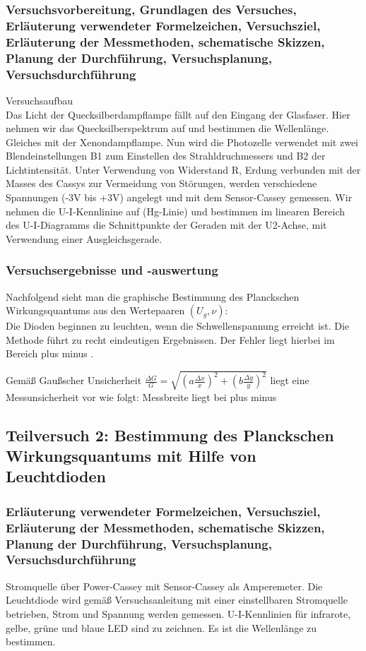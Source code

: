 \documentclass[12pt,oneside,oldfontcommands]{memoir}
\begin{document}
\subsubsection{Versuchsvorbereitung, Grundlagen des Versuches, Erläuterung verwendeter Formelzeichen, Versuchsziel, Erläuterung der Messmethoden, schematische Skizzen, Planung der Durchführung, Versuchsplanung, Versuchsdurchführung}
Versuchsaufbau\\
Das Licht der Quecksilberdampflampe fällt auf den Eingang der Glasfaser. Hier nehmen wir das Quecksilberspektrum auf und bestimmen die Wellenlänge. Gleiches mit der Xenondampflampe.
Nun wird die Photozelle verwendet mit zwei Blendeinstellungen B1 zum Einstellen des Strahldruchmessers und B2 der Lichtintensität. Unter Verwendung von Widerstand R, Erdung verbunden mit der Masses des Cassys zur Vermeidung von Störungen, werden verschiedene Spannungen (-3V bis +3V) angelegt und mit dem Sensor-Cassey gemessen.
Wir nehmen die U-I-Kennlinine auf (Hg-Linie) und bestimmen im linearen Bereich des U-I-Diagramms die Schnittpunkte der Geraden mit der U2-Achse, mit Verwendung einer Ausgleichsgerade.


\subsubsection{Versuchsergebnisse und -auswertung}
Nachfolgend sieht man die graphische Bestimmung des Planckschen Wirkungsquantums aus den Wertepaaren $(U_g,\nu)$:\\





Die Dioden beginnen zu leuchten, wenn die Schwellenspannung erreicht ist. 
Die Methode führt zu recht eindeutigen Ergebnissen. Der Fehler liegt hierbei im Bereich plus minus .

Gemäß Gaußscher Unsicherheit $\frac{\Delta G}{G} = \sqrt{(a\frac{\Delta x}{x})^2 + (b \frac{\Delta y}{y})^2}$ liegt eine Messunsicherheit vor wie folgt:
Messbreite liegt bei plus minus 

\subsection{Teilversuch 2: Bestimmung des Planckschen Wirkungsquantums mit Hilfe von Leuchtdioden}
\subsubsection{Erläuterung verwendeter Formelzeichen, Versuchsziel, Erläuterung der Messmethoden, schematische Skizzen, Planung der Durchführung, Versuchsplanung, Versuchsdurchführung}
Stromquelle über Power-Cassey mit Sensor-Cassey als Amperemeter. Die Leuchtdiode wird gemäß Versuchsanleitung mit einer einstellbaren Stromquelle betrieben, Strom und Spannung werden gemessen. U-I-Kennlinien für infrarote, gelbe, grüne und blaue LED sind zu zeichnen.
Es ist die Wellenlänge zu bestimmen.
\end{document}
